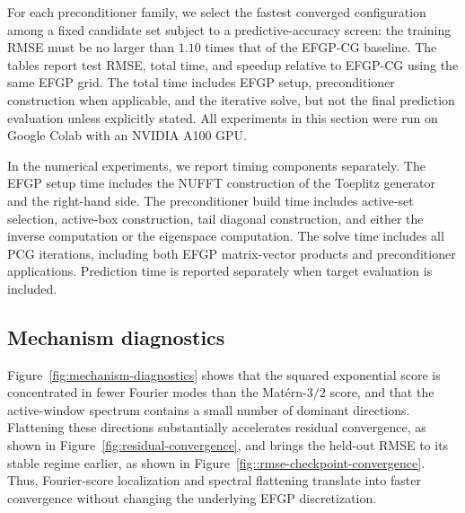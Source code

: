 For each preconditioner family, we select the fastest converged configuration among a fixed candidate set subject to a predictive-accuracy screen: the training RMSE must be no larger than \(1.10\) times that of the EFGP-CG baseline. The tables report test RMSE, total time, and speedup relative to EFGP-CG using the same EFGP grid. The total time includes EFGP setup, preconditioner construction when applicable, and the iterative solve, but not the final prediction evaluation unless explicitly stated. All experiments in this section were run on Google Colab with an NVIDIA A100 GPU.

In the numerical experiments, we report timing components separately. The EFGP setup time includes the NUFFT construction of the Toeplitz generator and the right-hand side. The preconditioner build time includes active-set selection, active-box construction, tail diagonal construction, and either the inverse computation or the eigenspace computation. The solve time includes all PCG iterations, including both EFGP matrix-vector products and preconditioner applications. Prediction time is reported separately when target evaluation is included.





\subsection{Mechanism diagnostics}
\label{subsec:mechanism-diagnostics}
Figure~\ref{fig:mechanism-diagnostics} shows that the squared exponential
score is concentrated in fewer Fourier modes than the Mat\'ern-\(3/2\) score,
and that the active-window spectrum contains a small number of dominant
directions. Flattening these directions substantially accelerates residual
convergence, as shown in Figure~\ref{fig:residual-convergence}, and brings the
held-out RMSE to its stable regime earlier, as shown in
Figure~\ref{fig::rmse-checkpoint-convergence}. Thus, Fourier-score localization and
spectral flattening translate into faster convergence without changing the
underlying EFGP discretization.



